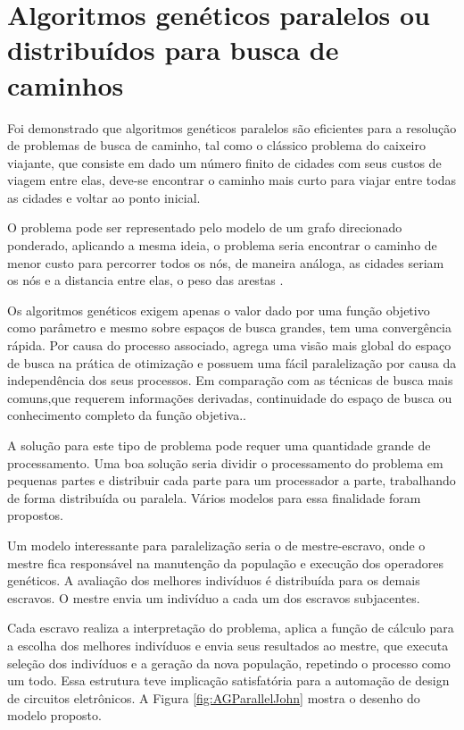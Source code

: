 \section{Algoritmos genéticos paralelos ou distribuídos para busca de caminhos}

Foi demonstrado que algoritmos genéticos paralelos são eficientes para a resolução de problemas de busca de caminho, tal como o clássico problema do caixeiro viajante, que consiste em dado um número finito de cidades com seus custos de viagem entre elas, deve-se encontrar o caminho mais curto para viajar entre todas as cidades e voltar ao ponto inicial. 

O problema pode ser representado pelo modelo de um grafo direcionado ponderado, aplicando a mesma ideia, o problema seria encontrar o caminho de menor custo para percorrer todos os nós, de maneira análoga, as cidades seriam os nós e a distancia entre elas, o peso das arestas \cite{Jason}\cite{Alaoui}\cite{Heinz}.

Os algoritmos genéticos exigem apenas o valor dado por uma função objetivo como parâmetro e mesmo sobre espaços de busca grandes, tem uma convergência rápida. Por causa do processo associado, agrega uma visão mais global do espaço de busca na prática de otimização e possuem uma fácil paralelização por causa da independência dos seus processos. Em comparação com as técnicas de busca mais comuns,que requerem informações derivadas, continuidade do espaço de busca ou conhecimento completo da função objetiva.\cite{Vilson}.

A solução para este tipo de problema pode requer uma quantidade grande de processamento. Uma boa solução seria dividir o processamento do problema em pequenas partes e distribuir cada parte para um processador a parte, trabalhando de forma distribuída ou paralela. Vários modelos para essa finalidade foram propostos.

Um modelo interessante para paralelização seria o de mestre-escravo, onde o mestre fica responsável na manutenção da população e execução dos operadores genéticos. A avaliação dos melhores indivíduos é distribuída para os demais escravos. O mestre envia um indivíduo a cada um dos escravos subjacentes. 

Cada escravo realiza a interpretação do problema, aplica a função de cálculo para a escolha dos melhores indivíduos e envia seus resultados ao mestre, que executa seleção dos indivíduos e a geração da nova população, repetindo o processo como um todo. Essa estrutura teve implicação satisfatória para a automação de design de circuitos eletrônicos\cite{Jason}. A Figura \ref{fig:AGParallelJohn} mostra o desenho do modelo proposto.

